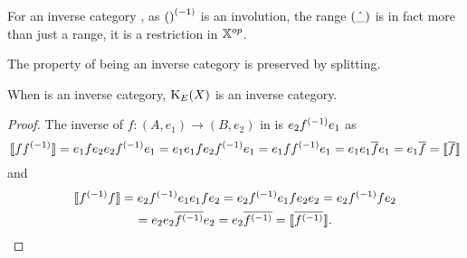 For an inverse category \X, as ${()}^{(-1)}$ is an involution, the range $(\hat{\_})$ is in fact more
than just a range, it is a restriction in $\mathbb{X}^{op}$.

The property of being an inverse category is preserved by splitting.

\begin{lemma}\label{lem:the_idempotent_splitting_of_an_inverse_category_is_an_inverse_category}
  When \X is an inverse category, $\text{K}_{E}(X)$ is an inverse category.
\end{lemma}
\begin{proof}
  The inverse of $f:(A,e_1)\to(B,e_2)$   in  is $e_2{f}^{(-1)}e_1$ as
  \[
    \llbracket f {f}^{(-1)} \rrbracket = e_1 f e_2 e_2 {f}^{(-1)} e_1
    = e_1 e_1 f e_2 {f}^{(-1)} e_1
    = e_1 f  {f}^{(-1)} e_1
    = e_1 e_1 \overline{f} e_1
    = e_1 \overline{f}
    = \llbracket\overline{f}\rrbracket
  \]
  and
  \begin{multline*}
    \llbracket {f}^{(-1)} f\rrbracket=
    e_2 {f}^{(-1)} e_1 e_1 f e_2
    = e_2 {f}^{(-1)} e_1 f e_2 e_2
    = e_2 {f}^{(-1)} f  e_2\\
    = e_2 e_2 \overline{{f}^{(-1)}}  e_2
    = e_2 \overline{{f}^{(-1)}}
    = \llbracket\overline{{f}^{(-1)}}\rrbracket.
  \end{multline*}

\end{proof}

